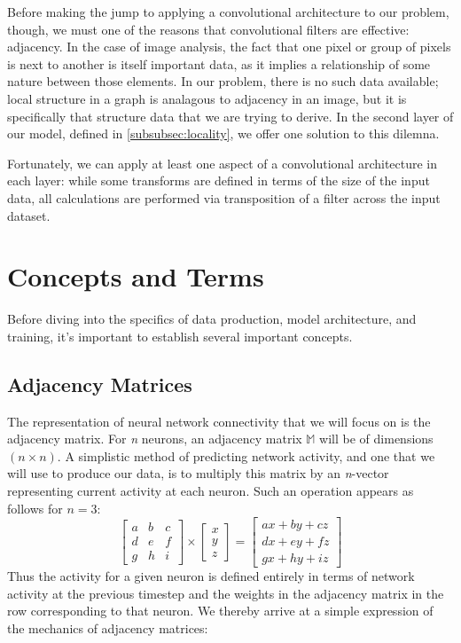 Before making the jump to applying a convolutional architecture to our problem, 
though, we must one of the reasons that convolutional filters are effective: 
adjacency. In the case of image analysis, the fact that one pixel or group of 
pixels is next to another is itself important data, as it implies a relationship 
of some nature between those elements. In our problem, there is no such data 
available; local structure in a graph is analagous to adjacency in an image, but 
it is specifically that structure data that we are trying to derive. In the 
second layer of our model, defined in \ref{subsubsec:locality}, we offer one 
solution to this dilemna.

Fortunately, we can apply at least one aspect of a convolutional architecture in 
each layer: while some transforms are defined in terms of the size of the input 
data, all calculations are performed via transposition of a filter across the 
input dataset.


\section{Concepts and Terms}
Before diving into the specifics of data production, model architecture, and 
training, it's important to establish several important concepts.

\subsection{Adjacency Matrices}
\label{subsec:adjacency}
The representation of neural network connectivity that we will focus on is the 
adjacency matrix. For \textit{n} neurons, an adjacency matrix $\mathbb{M}$ will 
be of dimensions $(n \times n)$. A simplistic method of predicting network 
activity, and one that we will use to produce our data, is to multiply this 
matrix by an \textit{n}-vector representing current activity at each neuron.  
Such an operation appears as follows for $n=3$:
\[ \begin{bmatrix}
		a & b & c\\
		d & e & f\\
		g & h & i
	\end{bmatrix}
	\times
	\begin{bmatrix}
		x\\
		y\\
		z
	\end{bmatrix}
	=
	\begin{bmatrix}
		ax + by + cz\\
		dx + ey + fz\\
		gx + hy + iz
	\end{bmatrix}
\]
Thus the activity for a given neuron is defined entirely in terms of network 
activity at the previous timestep and the weights in the adjacency matrix in the 
row corresponding to that neuron. We thereby arrive at a simple expression of 
the mechanics of adjacency matrices: 


